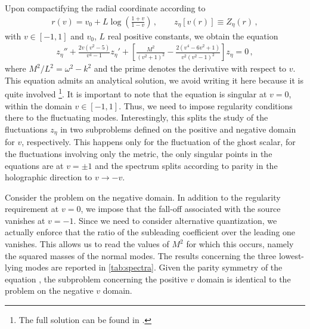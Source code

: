Upon compactifying the radial coordinate according to
\begin{eqnarray}
	\label{eq:compa}
	r(v) = v_0 + L \log \left(\frac{1+v}{1-v}\right)
	\,, \qquad 
	z_\eta[v(r)] \equiv Z_\eta\left(r\right)\,,
\end{eqnarray}
with $v\in\left[-1,1\right]$ and $v_0$, $L$ real positive constants, we obtain the equation 
\begin{eqnarray}
	\label{eq:zeta}
	z_\eta''
	+
	\frac{2 v \left(v^2-5\right) }{v^4-1}
	z_\eta'
	+
	\left[\frac{M^2}{\left(v^2+1\right)^2}-\frac{2 \left(v^4-6 v^2+1\right)}{v^2 \left(v^2-1\right)^2}\right] 
	z_\eta
	=
	0\,,
\end{eqnarray}
where $M^2/L^2 = \omega^2-k^2$ and the prime denotes the derivative with respect to $v$.
This equation admits an analytical solution, we avoid writing it here because it is quite involved%
\footnote{The full solution can be found in \cite{code}.}.
It is important to note that the equation  is singular at $v=0$, within the domain $v\in\left[-1,1\right]$.
Thus, we need to impose regularity conditions there to the fluctuating modes.
Interestingly, this splits the study of the fluctuations $z_\eta$ in two subproblems defined on the positive and negative domain for $v$, respectively.
This happens only for the fluctuation of the ghost scalar, for the fluctuations involving only the metric, the only singular points in the equations are at $v=\pm 1$ and the spectrum splits according to parity in the holographic direction to $v\to -v$.

Consider the problem on the negative domain.
In addition to the regularity requirement at $v=0$, we impose that the fall-off associated with the source vanishes at $v=-1$.
Since we need to consider alternative quantization, we actually enforce that the ratio of the subleading coefficient over the leading one vanishes.
This allows us to read the values of $M^2$ for which this occurs, namely the squared masses of the normal modes.
The results concerning the three lowest-lying modes are reported in \cref{tab:spectra}.
Given the parity symmetry of the equation , the subproblem concerning the positive $v$ domain is identical to the problem on the negative $v$ domain.

